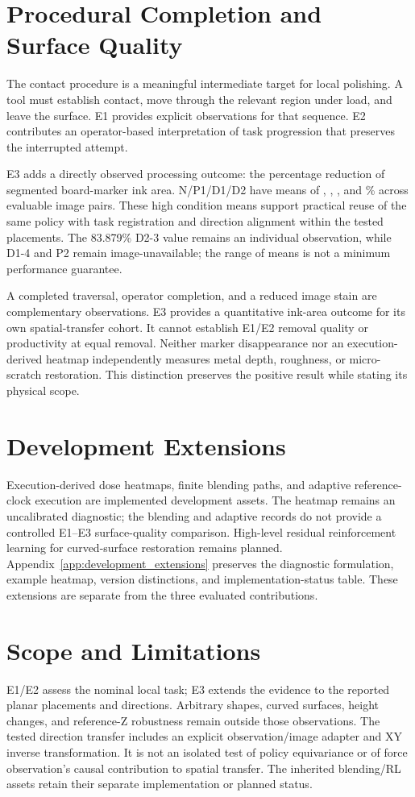 \section{Procedural Completion and Surface Quality}
The contact procedure is a meaningful intermediate target for local polishing. A tool must establish contact, move through the relevant region under load, and leave the surface. E1 provides explicit observations for that sequence. E2 contributes an operator-based interpretation of task progression that preserves the interrupted attempt.

E3 adds a directly observed processing outcome: the percentage reduction of segmented board-marker ink area. N/P1/D1/D2 have means of \EthreeNRemoval, \EthreePoneRemoval, \EthreeDoneRemoval, and \EthreeDtwoRemoval\% across \EthreeImageN{} evaluable image pairs. These high condition means support practical reuse of the same policy with task registration and direction alignment within the tested placements. The 83.879\% D2-3 value remains an individual observation, while D1-4 and P2 remain image-unavailable; the range of means is not a minimum performance guarantee.

A completed traversal, operator completion, and a reduced image stain are complementary observations. E3 provides a quantitative ink-area outcome for its own spatial-transfer cohort. It cannot establish E1/E2 removal quality or productivity at equal removal. Neither marker disappearance nor an execution-derived heatmap independently measures metal depth, roughness, or micro-scratch restoration. This distinction preserves the positive result while stating its physical scope.

\section{Development Extensions}
Execution-derived dose heatmaps, finite blending paths, and adaptive reference-clock execution are implemented development assets. The heatmap remains an uncalibrated diagnostic; the blending and adaptive records do not provide a controlled E1--E3 surface-quality comparison. High-level residual reinforcement learning for curved-surface restoration remains planned. Appendix~\ref{app:development_extensions} preserves the diagnostic formulation, example heatmap, version distinctions, and implementation-status table. These extensions are separate from the three evaluated contributions.

\section{Scope and Limitations}
E1/E2 assess the nominal local task; E3 extends the evidence to the reported planar placements and directions. Arbitrary shapes, curved surfaces, height changes, and reference-Z robustness remain outside those observations. The tested direction transfer includes an explicit observation/image adapter and XY inverse transformation. It is not an isolated test of policy equivariance or of force observation's causal contribution to spatial transfer. The inherited blending/RL assets retain their separate implementation or planned status.

